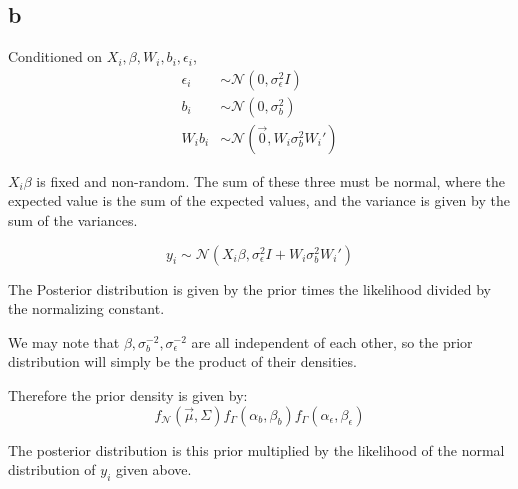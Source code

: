 \documentclass[12pt]{paper}
\newcommand{\normal}{\mathcal{N}}
\begin{document}
\subsection{b}
\label{sec:orgd42d3c7}
Conditioned on $X_i, \beta, W_i, b_i, \epsilon_i$,
\begin{align*}
  \epsilon_i &\sim \normal( 0, \sigma_{\epsilon}^{2}I)\\
  b_i &\sim \normal( 0, \sigma_{b}^{2})\\
  W_ib_i &\sim \normal( \vec{0}, W_i \sigma_{b}^{2} W_i' )
\end{align*}

$X_i \beta$ is fixed and non-random. The sum of these three must be
normal, where the expected value is the sum of the expected values,
and the variance is given by the sum of the variances.

\begin{equation}
  y_i \sim \normal\left( X_i \beta, \sigma_{\epsilon}^2 I + W_i \sigma_b^2 W_i' \right)
\end{equation}

The Posterior distribution is given by the prior times the likelihood
divided by the normalizing constant.

We may note that $\beta,\sigma_b^{-2}, \sigma_{\epsilon}^{-2}$ are all independent of each
other, so the prior distribution will simply be the product of their
densities.

Therefore the prior density is given by:
\begin{equation}
  f_{\mathcal{N}}(\vec{\mu}, \Sigma) f_{\Gamma}(\alpha_b, \beta_b) f_{\Gamma}(\alpha_{\epsilon}, \beta_{\epsilon})
\end{equation}


The posterior distribution is this prior multiplied by the likelihood
of the normal distribution of $y_i$ given above.
\end{document}
